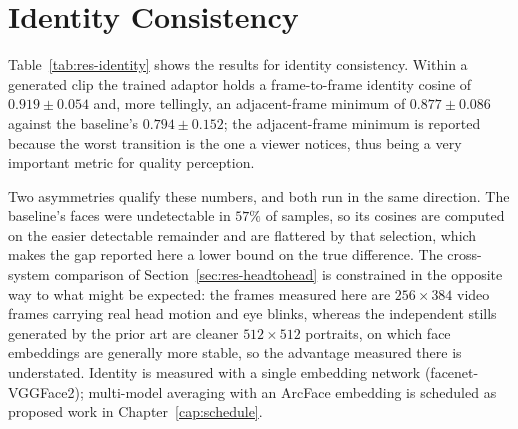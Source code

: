 
\section{Identity Consistency}\label{sec:res-identity}


Table~\ref{tab:res-identity} shows the results for identity consistency. Within a generated clip
the trained adaptor holds a frame-to-frame identity cosine of $0.919\pm0.054$ and, more tellingly,
an adjacent-frame minimum of $0.877\pm0.086$ against the baseline's $0.794\pm0.152$; the
adjacent-frame minimum is reported because the worst transition is the one a viewer notices, thus being a very important metric for quality perception.

Two asymmetries qualify these numbers, and both run in the same direction. The baseline's faces
were undetectable in $57\%$ of samples, so its cosines are computed on the easier detectable
remainder and are flattered by that selection, which makes the gap reported here a lower bound on
the true difference. The cross-system comparison of Section~\ref{sec:res-headtohead} is
constrained in the opposite way to what might be expected: the frames measured here are
$256\times384$ video frames carrying real head motion and eye blinks, whereas the independent
stills generated by the prior art are cleaner $512\times512$ portraits, on which face embeddings
are generally more stable, so the advantage measured there is understated.
Identity is measured with a single embedding network (facenet-VGGFace2); multi-model averaging
with an ArcFace embedding is scheduled as proposed work in Chapter~\ref{cap:schedule}.


